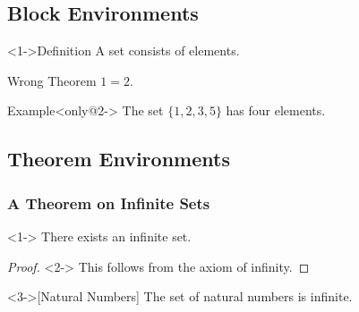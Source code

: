 \documentclass{beamer}
\begin{document}
\subsection{Block Environments}
\begin{frame}
  \begin{block}<1->{Definition}
    A \alert{set} consists of elements.
  \end{block}
  \begin{alertblock}{Wrong Theorem}
    $1=2$.
  \end{alertblock}
  \begin{exampleblock}{Example}<only@2->
    The set $\{1,2,3,5\}$ has four elements.
  \end{exampleblock}
\end{frame}
\subsection{Theorem Environments}
\begin{frame}
  \frametitle{A Theorem on Infinite Sets}
  \begin{theorem}<1->
    There exists an infinite set.
  \end{theorem}
  \begin{proof}<2->
    This follows from the axiom of infinity.
  \end{proof}
  \begin{example}<3->[Natural Numbers]
    The set of natural numbers is infinite.
  \end{example}
\end{frame}
\end{document}
